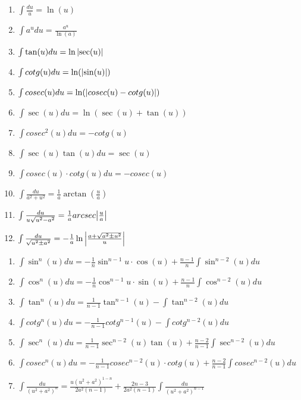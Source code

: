 \documentclass{article}
\begin{document}
\begin{enumerate}
  \item $\int \frac{du}{u} = \ln(u)$ \\
  \item $\int a^u du = \frac{a^u}{\ln(a)}$ \\
  \item $\int \tan(u) du = \ln \abs{\sec(u)}$ \\
  \item $\int cotg(u) du = \ln(\abs{\sin(u)})$ \\
  \item $\int cosec(u) du = \ln(\abs{cosec(u) - cotg(u)})$ \\
  \item $\int \sec(u) du = \ln(\sec(u) + \tan(u))$ \\
  \item $\int cosec^2(u) du = -cotg(u)$
  \item $\int \sec(u)\tan(u) du = \sec(u)$
  \item $\int cosec(u) \cdot cotg(u) du = - cosec(u)$
  \item $\int \frac{du}{a^2 + u^2} = \frac{1}{a} \arctan (\frac{u}{a})$
  \item $\int \frac{du}{u\sqrt{u^2-a^2}} = \frac{1}{a}arcsec \abs{\frac{u}{a}}$
  \item $\int \frac{du}{\sqrt{u^2\pm a^2}} = -\frac{1}{a} \ln \abs{\frac{a+ \sqrt{a^2 \pm u^2}}{u}}$  
\end{enumerate}

\begin{enumerate}
  \item $\int \sin^n(u) du = -\frac{1}{n}\sin^{n-1}u \cdot \cos(u) + \frac{n-1}{n} \int \sin^{n-2}(u) du$ \\
  \item $\int \cos^n(u) du = -\frac{1}{n}\cos^{n-1}u \cdot \sin(u) + \frac{n-1}{n} \int \cos^{n-2}(u) du$ \\
  \item $\int \tan^n(u) du = \frac{1}{n-1} \tan^{n-1}(u) - \int \tan^{n-2}(u) du$ \\
  \item $\int cotg^n(u) du = -\frac{1}{n-1} cotg^{n-1}(u) - \int cotg^{n-2}(u) du$ \\
  \item $\int \sec^n(u) du = \frac{1}{n-1} \sec^{n-2}(u) \tan(u) + \frac{n-2}{n-1} \int \sec^{n-2}(u) du$ \\
  \item $\int cosec^n(u) du = -\frac{1}{n-1} cosec^{n-2}(u) \cdot cotg(u) + \frac{n-2}{n-1} \int cosec^{n-2}(u) du$ \\
  \item $\int \frac{du}{(u^2+ a^2)^n} = \frac{u(u^2+a^2)^{1-n}}{2a^2(n-1)} + \frac{2n-3}{2a^2(n-1)} \int \frac{du}{(u^2 + a^2)^{n-1}}$ 
\end{enumerate}
\end{document}
